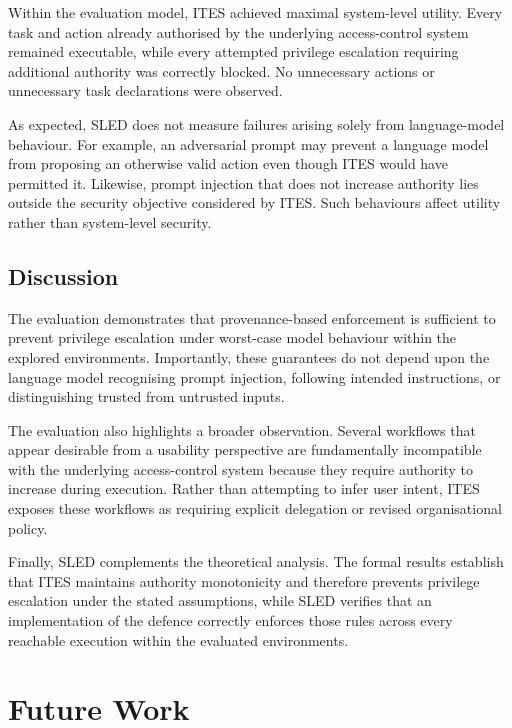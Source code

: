 \documentclass{article} %
\begin{document}
Within the evaluation model, ITES achieved maximal system-level utility. Every task and action already authorised by the underlying access-control system remained executable, while every attempted privilege escalation requiring additional authority was correctly blocked. No unnecessary actions or unnecessary task declarations were observed.

As expected, SLED does not measure failures arising solely from language-model behaviour. For example, an adversarial prompt may prevent a language model from proposing an otherwise valid action even though ITES would have permitted it. Likewise, prompt injection that does not increase authority lies outside the security objective considered by ITES. Such behaviours affect utility rather than system-level security.

\subsection{Discussion}

The evaluation demonstrates that provenance-based enforcement is sufficient to prevent privilege escalation under worst-case model behaviour within the explored environments. Importantly, these guarantees do not depend upon the language model recognising prompt injection, following intended instructions, or distinguishing trusted from untrusted inputs.

The evaluation also highlights a broader observation. Several workflows that appear desirable from a usability perspective are fundamentally incompatible with the underlying access-control system because they require authority to increase during execution. Rather than attempting to infer user intent, ITES exposes these workflows as requiring explicit delegation or revised organisational policy.

Finally, SLED complements the theoretical analysis. The formal results establish that ITES maintains authority monotonicity and therefore prevents privilege escalation under the stated assumptions, while SLED verifies that an implementation of the defence correctly enforces those rules across every reachable execution within the evaluated environments.















\section{Future Work}
\end{document}
